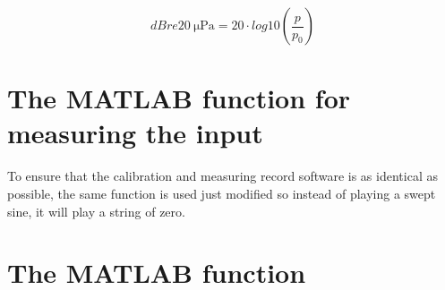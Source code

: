 \begin{equation}
dB re \SI{20}{\micro\pascal} = 20 \cdot log10(\frac{p}{p_0})
\end{equation}

    \startexplain
    \stopexplain  


\section*{The MATLAB function for measuring the input}
To ensure that the calibration and measuring record software is as identical as possible, the same function is used just modified so instead of playing a swept sine, it will play a string of zero.

\section*{The MATLAB function}



